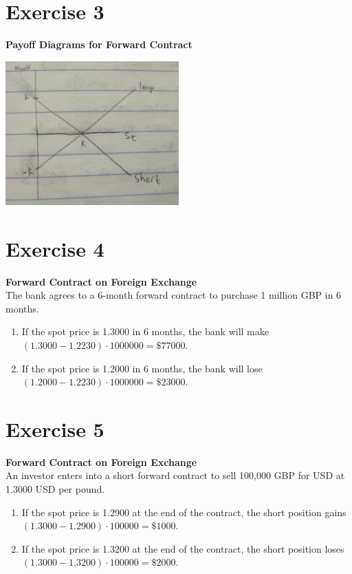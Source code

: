 \documentclass{article}
\begin{document}
\section*{Exercise 3}
\begin{flushleft}
    \textbf{Payoff Diagrams for Forward Contract}
\end{flushleft}
\begin{center}
    \includegraphics[width=0.5\textwidth]{figures/ex3.jpg}
\end{center}

\section*{Exercise 4}
\begin{flushleft}
    \textbf{Forward Contract on Foreign Exchange} \\
    The bank agrees to a 6-month forward contract to purchase 1 million GBP in 6 months.
    \begin{enumerate}
        \item If the spot price is 1.3000 in 6 months, the bank will make $(1.3000 - 1.2230) \cdot 1000000 = \$77000$.
        \item If the spot price is 1.2000 in 6 months, the bank will lose $(1.2000 - 1.2230) \cdot 1000000 = \$23000$.
    \end{enumerate}
\end{flushleft}

\section*{Exercise 5}
\begin{flushleft}
    \textbf{Forward Contract on Foreign Exchange} \\
    An investor enters into a short forward contract to sell 100,000 GBP for USD at 1.3000 USD per pound.
    \begin{enumerate}
        \item If the spot price is 1.2900 at the end of the contract, the short position gains $(1.3000 - 1.2900) \cdot 100000 = \$1000$.
        \item If the spot price is 1.3200 at the end of the contract, the short position loses $(1.3000 - 1.3200) \cdot 100000 = \$2000$.
    \end{enumerate}
\end{flushleft}
\end{document}
